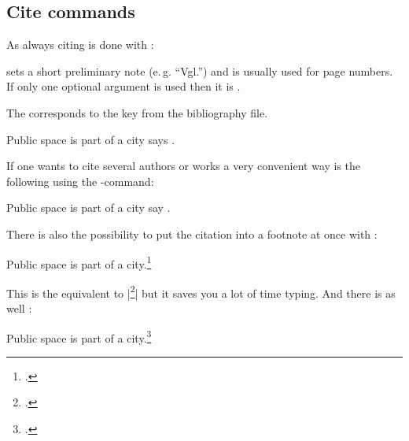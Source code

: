 \documentclass[a4paper,
10pt,
greek,
french,
spanish,
italian,
ngerman,
english
]{ltxdoc}
\begin{document}
\subsection{Cite commands}\label{cite-commands}
\DescribeMacro{\cite}
As always citing is done with :

 sets a short preliminary note (e.\,g. \enquote{Vgl.}) and  is usually used for page numbers.
If only one optional argument is used then it is .
The  corresponds to the key from the bibliography file.

\begin{example}
Public space is part of a city says \cite{Osland2016}.
\end{example}
\DescribeMacro{\cites}
If one wants to cite several authors or works a very convenient way is the following using the -command:
\begin{example}
Public space is part of a city say \cites(cf.)(){Osland2016}{Evangelidis2014}.
\end{example}

 \DescribeMacro{\footcite}
 There is also the possibility to put the citation into a footnote at once with :
\begin{example}
Public space is part of a city.\footcite{Osland2016}
\end{example}
This is the equivalent to |\footnote{\cite{Osland2016}.}| but it saves you a lot of time typing.
 \DescribeMacro{\footcites} And there is as well :
\begin{example}
Public space is part of a city.\footcites(cf.)(){Osland2016}{Evangelidis2014}
\end{example}
 
\end{document}

